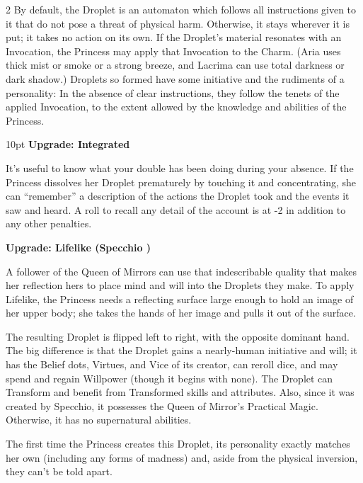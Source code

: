 \begin{multicols}{2}
By default, the Droplet is an automaton which follows all instructions given to it that do not pose a threat of physical harm. Otherwise, it stays wherever it is put; it takes no action on its own. If the Droplet's material resonates with an Invocation, the Princess may apply that Invocation to the Charm. (Aria uses thick mist or smoke or a strong breeze, and Lacrima can use total darkness or dark shadow.) Droplets so formed have some initiative and the rudiments of a personality: In the absence of clear instructions, they follow the tenets of the applied Invocation, to the extent allowed by the knowledge and abilities of the Princess.

\begin{myindentpar}{10pt} \textbf{Upgrade: Integrated}

It's useful to know what your double has been doing during your absence. If the Princess dissolves her Droplet prematurely by touching it and concentrating, she can “remember” a description of the actions the Droplet took and the events it saw and heard. A roll to recall any detail of the account is at -2 in addition to any other penalties. 

\textbf{Upgrade: Lifelike (Specchio \textbullet\textbullet\textbullet)}

A follower of the Queen of Mirrors can use that indescribable quality that makes her reflection hers to place mind and will into the Droplets they make. To apply Lifelike, the Princess needs a reflecting surface large enough to hold an image of her upper body; she takes the hands of her image and pulls it out of the surface. 

The resulting Droplet is flipped left to right, with the opposite dominant hand. The big difference is that the Droplet gains a nearly-human initiative and will; it has the Belief dots, Virtues, and Vice of its creator, can reroll dice, and may spend and regain Willpower (though it begins with none). The Droplet can Transform and benefit from Transformed skills and attributes. Also, since it was created by Specchio, it possesses the Queen of Mirror's Practical Magic. Otherwise, it has no supernatural abilities. 

The first time the Princess creates this Droplet, its personality exactly matches her own (including any forms of madness) and, aside from the physical inversion, they can't be told apart.


\end{myindentpar}
\end{multicols}
